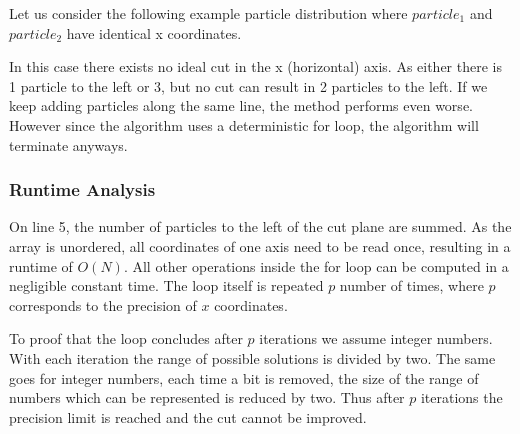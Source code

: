 \documentclass[]{article}
\begin{document}
Let us consider the following example particle distribution where $particle_1$ and $particle_2$ have identical x coordinates. 

\begin{figure}[H]
	\begin{center}
	\end{center}
\end{figure}

In this case there exists no ideal cut in the x (horizontal) axis. As either there is 1 particle to the left or 3, but no cut can result in 2 particles to the left. If we keep adding particles along the same line, the method performs even worse. However since the algorithm uses a deterministic for loop, the algorithm will terminate anyways. 


\subsubsection{Runtime Analysis}

On line 5, the number of particles to the left of the cut plane are summed. As the array is unordered, all coordinates of one axis need to be read once, resulting in a runtime of $O(N)$. All other operations inside the for loop can be computed in a negligible constant time. The loop itself is repeated $p$ number of times, where $p$ corresponds to the precision of $x$ coordinates.

To proof that the loop concludes after $p$ iterations we assume integer numbers. With each iteration the range of possible solutions is divided by two. The same goes for integer numbers, each time a bit is removed, the size of the range of numbers which can be represented is reduced by two. Thus after $p$ iterations the precision limit is reached and the cut cannot be improved.
\end{document}

